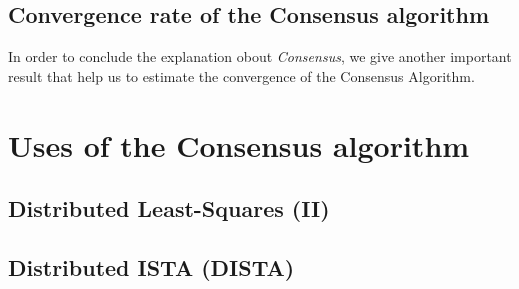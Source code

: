 \subsection{Convergence rate of the Consensus algorithm}
In order to conclude the explanation obout \textit{Consensus}, we give another important result that help us to estimate the convergence of the Consensus Algorithm.\\

\hspace*{-5mm}
%



\section{\noindent
Uses of the Consensus algorithm}

\subsection{Distributed Least-Squares (II)}

\subsection{Distributed ISTA (DISTA)}
